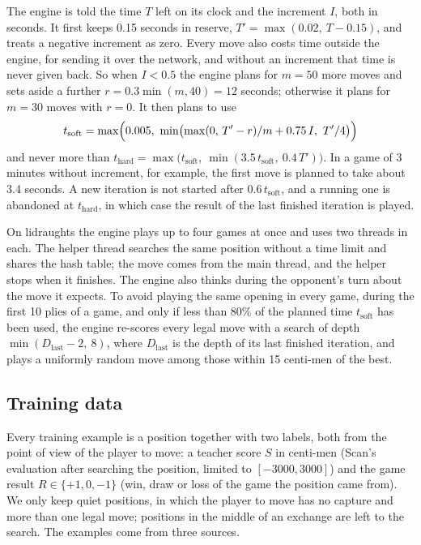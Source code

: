 The engine is told the time $T$ left on its clock and the increment $I$, both in
seconds. It first keeps 0.15 seconds in reserve, $T' = \max(0.02,\ T-0.15)$, and
treats a negative increment as zero. Every move also costs time outside the
engine, for sending it over the network, and without an increment that time is
never given back. So when $I<0.5$ the engine plans for $m=50$ more moves and sets
aside a further $r = 0.3\min(m,40) = 12$ seconds; otherwise it plans for $m=30$
moves with $r=0$. It then plans to use
\begin{equation}\label{eq:time}
  t_{\text{soft}} = \max\Bigl(0.005,\ \min\bigl(\max(0,\,T'-r)/m + 0.75\,I,\
  T'/4\bigr)\Bigr)
\end{equation}
and never more than $t_{\text{hard}} = \max\bigl(t_{\text{soft}},\
\min(3.5\,t_{\text{soft}},\ 0.4\,T')\bigr)$. In a game of 3 minutes without
increment, for example, the first move is planned to take about 3.4 seconds. A
new iteration is not started after $0.6\,t_{\text{soft}}$, and a running one is
abandoned at $t_{\text{hard}}$, in which case the result of the last finished
iteration is played.

On lidraughts the engine plays up to four games at once and uses two threads in
each. The helper thread searches the same position without a time limit and
shares the hash table; the move comes from the main thread, and the helper stops
when it finishes. The engine also thinks during the opponent's turn about the
move it expects. To avoid playing the same
opening in every game, during the first 10 plies of a game, and only if less than
80\% of the planned time $t_{\text{soft}}$ has been used, the engine re-scores
every legal move with a search of depth $\min(D_{\text{last}}-2,\ 8)$, where
$D_{\text{last}}$ is the depth of its last finished iteration, and plays a
uniformly random move among those within 15 centi-men of the best.

\subsection{Training data}\label{sec:data}

Every training example is a position together with two labels, both from the
point of view of the player to move: a teacher score $S$ in centi-men (Scan's
evaluation after searching the position, limited to $[-3000,3000]$) and the game
result $R\in\{+1,0,-1\}$ (win, draw or loss of the game the position came from).
We only keep quiet positions, in which the player to move has no capture and more
than one legal move; positions in the middle of an exchange are left to the
search. The examples come from three sources.

